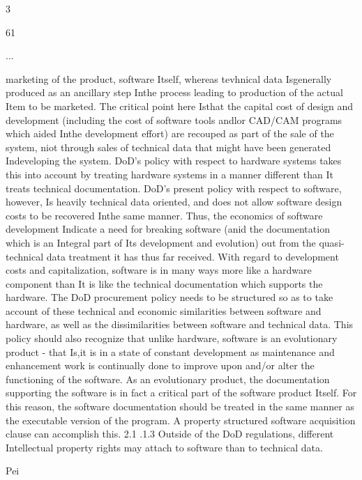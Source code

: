 \documentclass[12pt]{article}
\begin{document}
3

61

...

marketing of the product, software Itself, whereas tevhnical data Isgenerally produced as an ancillary
step Inthe process leading to production of the actual Item to be marketed.
The critical point here Isthat the capital cost of design and development (including the cost of software tools andlor CAD/CAM programs which aided Inthe development effort) are recouped as part of
the sale of the system, niot through sales of technical data that might have been generated Indeveloping the system. DoD's policy with respect to hardware systems takes this into account by treating
hardware systems in a manner different than It treats technical documentation. DoD's present policy
with respect to software, however, Is heavily technical data oriented, and does not allow software
design costs to be recovered Inthe same manner.
Thus, the economics of software development Indicate a need for breaking software (anid the documentation which is an Integral part of Its development and evolution) out from the quasi-technical data
treatment it has thus far received. With regard to development costs and capitalization, software is in
many ways more like a hardware component than It is like the technical documentation which supports the hardware. The DoD procurement policy needs to be structured so as to take account of
these technical and economic similarities between software and hardware, as well as the dissimilarities between software and technical data.
This policy should also recognize that unlike hardware, software is an evolutionary product - that Is,it
is in a state of constant development as maintenance and enhancement work is continually done to
improve upon and/or alter the functioning of the software. As an evolutionary product, the documentation supporting the software is in fact a critical part of the software product Itself. For this reason,
the software documentation should be treated in the same manner as the executable version of the
program. A property structured software acquisition clause can accomplish this.
2.1 .1.3 Outside of the DoD regulations, different Intellectual property rights may attach to
software than to technical data.

Pei
\end{document}

